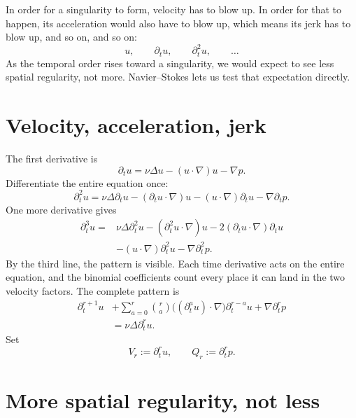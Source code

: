 \documentclass[12pt]{article}
\begin{document}
In order for a singularity to form, velocity has to blow up. In order for that
to happen, its acceleration would also have to blow up, which means its jerk
has to blow up, and so on, and so on:
\[
  u,
  \qquad
  \partial_tu,
  \qquad
  \partial_t^2u,
  \qquad
  \ldots
\]
As the temporal order rises toward a singularity, we would expect to see less
spatial regularity, not more. Navier--Stokes lets us test that expectation
directly.

\section*{Velocity, acceleration, jerk}

The first derivative is
\[
  \partial_tu
  =
  \nu\Delta u
  -(u\cdot\nabla)u
  -\nabla p.
\]
Differentiate the entire equation once:
\[
  \partial_t^2u
  =
  \nu\Delta\partial_tu
  -(\partial_tu\cdot\nabla)u
  -(u\cdot\nabla)\partial_tu
  -\nabla\partial_tp.
\]
One more derivative gives
\[
\begin{aligned}
  \partial_t^3u
  ={}&
  \nu\Delta\partial_t^2u
  -(\partial_t^2u\cdot\nabla)u
  -2(\partial_tu\cdot\nabla)\partial_tu
  \\
  &-(u\cdot\nabla)\partial_t^2u
  -\nabla\partial_t^2p.
\end{aligned}
\]
By the third line, the pattern is visible. Each time derivative acts on the
entire equation, and the binomial coefficients count every place it can land in
the two velocity factors. The complete pattern is
\[
\begin{aligned}
  \partial_t^{r+1}u
  &+
  \sum_{a=0}^{r}\binom{r}{a}
  \bigl((\partial_t^au)\cdot\nabla\bigr)\partial_t^{r-a}u
  +
  \nabla\partial_t^rp
  \\
  &=
  \nu\Delta\partial_t^ru.
\end{aligned}
\]
Set
\[
  V_r:=\partial_t^ru,
  \qquad
  Q_r:=\partial_t^rp.
\]

\section*{More spatial regularity, not less}
\end{document}
